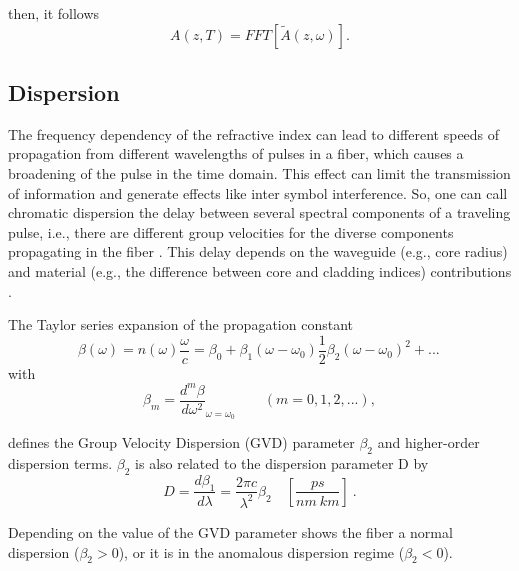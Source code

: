         then, it follows
        \begin{equation} \label{eq_deffft}
                A(z,T) = FFT \left[ \tilde{A}(z,\omega) \right].
            \end{equation}
            
            
    \subsection{Dispersion}
        The frequency dependency of the refractive index can lead to different speeds of propagation from different wavelengths of pulses in a fiber, which causes a broadening of the pulse in the time domain. This effect can limit the transmission of information and generate effects like inter symbol interference.  So, one can call chromatic dispersion the delay between several spectral components of a traveling pulse, i.e., there are different group velocities for the diverse components propagating in the fiber  \citep{Udayakumar2013ChromaticDC}. This delay depends on the waveguide (e.g., core radius) and material (e.g., the difference between core and cladding indices) contributions \citep{dudley_taylor_2010}. 
        
        The Taylor series expansion of the propagation constant 
        \begin{equation}
             \beta(\omega) = n (\omega)\frac{\omega}{c} = \beta_0 + \beta_1(\omega-\omega_0) \frac{1}{2}\beta_2(\omega-\omega_0)^2+...\, 
             \label{eq_betas}
        \end{equation}
        with 
        \begin{equation}
            \beta_m = \frac{d^m\beta}{d\omega^2}_{\omega = \omega_0} \qquad (m = 0,1,2,...),
            \label{eq_dbeta}
        \end{equation}
        
        
        defines the Group Velocity Dispersion (GVD) parameter $\beta_2$  and higher-order dispersion terms.  $\beta_2$ is also related to the dispersion parameter D by
        \begin{equation}
            D = \frac{d\beta_1}{d\lambda} = \frac{2\pi c}{\lambda^2}\beta_2 \quad [\frac{ps}{nm \ km}] \ .
            \label{eq_Ds}
        \end{equation}
        
        Depending on the value of the GVD parameter shows the fiber a normal dispersion ($\beta_2 > 0$), or it is in the anomalous dispersion regime ($\beta_2 < 0$).
        
